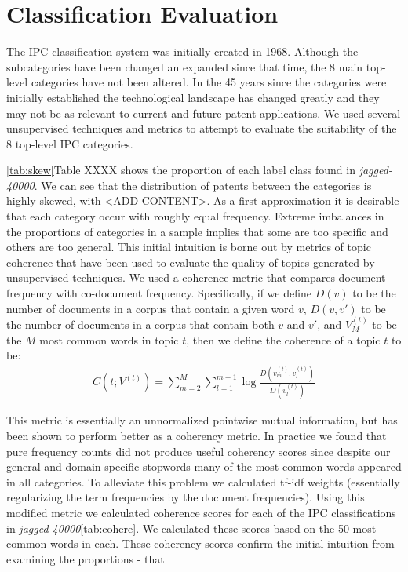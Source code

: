 \section{Classification Evaluation} %
\label{sec:classification_evaluation}

The IPC classification system was initially created in 1968. Although the subcategories have been changed an expanded since that time, the 8 main top-level categories have not been altered. In the 45 years since the categories were initially established the technological landscape has changed greatly and they may not be as relevant to current and future patent applications. We used several unsupervised techniques and metrics to attempt to evaluate the suitability of the 8 top-level IPC categories.

\ref{tab:skew}Table XXXX shows the proportion of each label class found in \emph{jagged-40000}. We can see that the distribution of patents between the categories is highly skewed, with <ADD CONTENT>. As a first approximation it is desirable that each category occur with roughly equal frequency. Extreme imbalances in the proportions of categories in a sample implies that some are too specific and others are too general. This initial intuition is borne out by metrics of topic coherence that have been used to evaluate the quality of topics generated by unsupervised techniques. We used a coherence metric that compares document frequency with co-document frequency\cite{Mimno_optimizingsemantic}. Specifically, if we define $D(v)$ to be the number of documents in a corpus that contain a given word $v$, $D(v, v')$ to be the number of documents in a corpus that contain both $v$ and $v'$, and $V^{(t)}_M$ to be the $M$ most common words in topic $t$, then we define the coherence of a topic $t$ to be:
\begin{align*}
	C(t;V^{(t)}) = \sum_{m=2}^M \sum_{l=1}^{m-1} \log \frac{D(v^{(t)}_m, v^{(t)}_l)}{D(v^{(t)}_l)}
\end{align*}

This metric is essentially an unnormalized pointwise mutual information, but has been shown to perform better as a coherency metric\cite{Mimno_optimizingsemantic}. In practice we found that pure frequency counts did not produce useful coherency scores since despite our general and domain specific stopwords many of the most common words appeared in all categories. To alleviate this problem we calculated tf-idf weights (essentially regularizing the term frequencies by the document frequencies). Using this modified metric we calculated coherence scores for each of the IPC classifications in \emph{jagged-40000}\ref{tab:cohere}. We calculated these scores based on the 50 most common words in each. These coherency scores confirm the initial intuition from examining the proportions - that 

